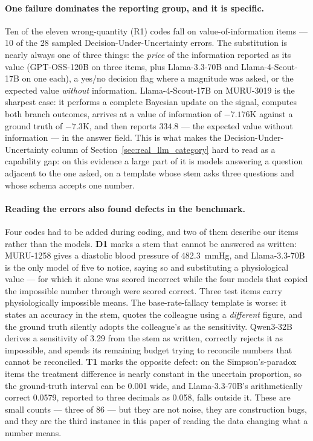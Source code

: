 \documentclass{article}
\begin{document}
\paragraph{One failure dominates the reporting group, and it is specific.} Ten of the eleven wrong-quantity (R1) codes fall on value-of-information items --- 10 of the 28 sampled Decision-Under-Uncertainty errors. The substitution is nearly always one of three things: the \emph{price} of the information reported as its value (GPT-OSS-120B on three items, plus Llama-3.3-70B and Llama-4-Scout-17B on one each), a yes/no decision flag where a magnitude was asked, or the expected value \emph{without} information. Llama-4-Scout-17B on MURU-3019 is the sharpest case: it performs a complete Bayesian update on the signal, computes both branch outcomes, arrives at a value of information of $-7.176$K against a ground truth of $-7.3$K, and then reports $334.8$ --- the expected value without information --- in the answer field. This is what makes the Decision-Under-Uncertainty column of Section~\ref{sec:real_llm_category} hard to read as a capability gap: on this evidence a large part of it is models answering a question adjacent to the one asked, on a template whose stem asks three questions and whose schema accepts one number.

\paragraph{Reading the errors also found defects in the benchmark.} Four codes had to be added during coding, and two of them describe our items rather than the models. \textbf{D1} marks a stem that cannot be answered as written: MURU-1258 gives a diastolic blood pressure of 482.3~mmHg, and Llama-3.3-70B is the only model of five to notice, saying so and substituting a physiological value --- for which it alone was scored incorrect while the four models that copied the impossible number through were scored correct. Three test items carry physiologically impossible means. The base-rate-fallacy template is worse: it states an accuracy in the stem, quotes the colleague using a \emph{different} figure, and the ground truth silently adopts the colleague's as the sensitivity. Qwen3-32B derives a sensitivity of 3.29 from the stem as written, correctly rejects it as impossible, and spends its remaining budget trying to reconcile numbers that cannot be reconciled. \textbf{T1} marks the opposite defect: on the Simpson's-paradox items the treatment difference is nearly constant in the uncertain proportion, so the ground-truth interval can be 0.001 wide, and Llama-3.3-70B's arithmetically correct 0.0579, reported to three decimals as 0.058, falls outside it. These are small counts --- three of 86 --- but they are not noise, they are construction bugs, and they are the third instance in this paper of reading the data changing what a number means.
\end{document}
